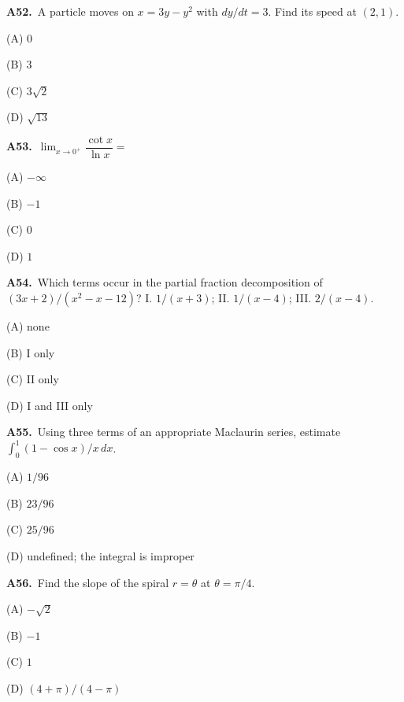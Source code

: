 \documentclass[11pt]{article}
\begin{document}
\bigskip\noindent\textbf{A52.}\ A particle moves on $x=3y-y^2$ with $dy/dt=3$. Find its speed at $(2,1)$.
\begin{list}{}{\setlength{\leftmargin}{3em}\setlength{\labelwidth}{2.5em}\setlength{\itemsep}{0pt}\setlength{\topsep}{2pt}}
\item[(A)] $0$
\item[(B)] $3$
\item[(C)] $3\sqrt2$
\item[(D)] $\sqrt{13}$
\end{list}

\bigskip\noindent\textbf{A53.}\ $\lim_{x\to0^+}\dfrac{\cot x}{\ln x}=$
\begin{list}{}{\setlength{\leftmargin}{3em}\setlength{\labelwidth}{2.5em}\setlength{\itemsep}{0pt}\setlength{\topsep}{2pt}}
\item[(A)] $-\infty$
\item[(B)] $-1$
\item[(C)] $0$
\item[(D)] $1$
\end{list}

\bigskip\noindent\textbf{A54.}\ Which terms occur in the partial fraction decomposition of $(3x+2)/(x^2-x-12)$? I. $1/(x+3)$; II. $1/(x-4)$; III. $2/(x-4)$.
\begin{list}{}{\setlength{\leftmargin}{3em}\setlength{\labelwidth}{2.5em}\setlength{\itemsep}{0pt}\setlength{\topsep}{2pt}}
\item[(A)] none
\item[(B)] I only
\item[(C)] II only
\item[(D)] I and III only
\end{list}

\bigskip\noindent\textbf{A55.}\ Using three terms of an appropriate Maclaurin series, estimate $\int_0^1(1-\cos x)/x\,dx$.
\begin{list}{}{\setlength{\leftmargin}{3em}\setlength{\labelwidth}{2.5em}\setlength{\itemsep}{0pt}\setlength{\topsep}{2pt}}
\item[(A)] $1/96$
\item[(B)] $23/96$
\item[(C)] $25/96$
\item[(D)] undefined; the integral is improper
\end{list}

\bigskip\noindent\textbf{A56.}\ Find the slope of the spiral $r=\theta$ at $\theta=\pi/4$.
\begin{list}{}{\setlength{\leftmargin}{3em}\setlength{\labelwidth}{2.5em}\setlength{\itemsep}{0pt}\setlength{\topsep}{2pt}}
\item[(A)] $-\sqrt2$
\item[(B)] $-1$
\item[(C)] $1$
\item[(D)] $(4+\pi)/(4-\pi)$
\end{list}
\end{document}
